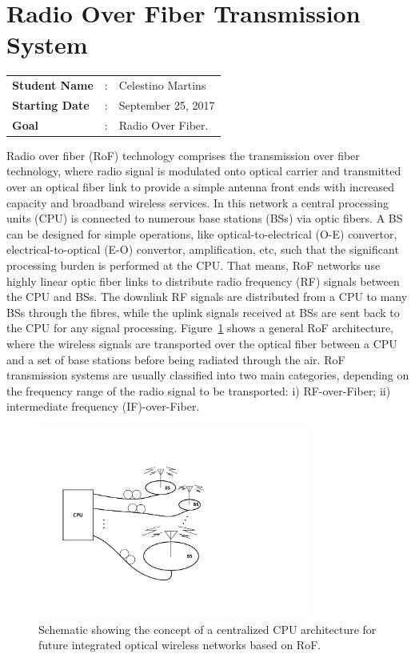 \clearpage
\section{Radio Over Fiber Transmission System}

\begin{tcolorbox}	
\begin{tabular}{p{2.75cm} p{0.2cm} p{10.5cm}} 	
\textbf{Student Name}  &:& Celestino Martins\\
\textbf{Starting Date} &:& September 25, 2017\\
\textbf{Goal}          &:& Radio Over Fiber.
\end{tabular}
\end{tcolorbox}

Radio over fiber (RoF) technology comprises the transmission over fiber technology, where radio signal is modulated onto optical carrier and transmitted over an optical fiber link to provide a simple antenna front ends with increased capacity and broadband wireless services.  In this network a central processing units (CPU) is connected to numerous base stations (BSs) via optic fibers. A BS can be designed for simple operations, like optical-to-electrical (O-E) convertor, electrical-to-optical (E-O) convertor,  amplification, etc, such that the significant processing burden is performed at the CPU. That means, RoF networks use highly linear optic fiber links to distribute radio frequency (RF) signals between the CPU and BSs. The downlink RF signals are distributed from a CPU to many BSs through the fibres, while the uplink signals received at BSs are sent back to the CPU for any signal processing. Figure~\ref{fig_RoFarch} shows a general RoF architecture, where the wireless signals are transported over the optical fiber between a CPU and a set of base stations before being radiated through the air. RoF transmission systems are usually classified into two main categories, depending on the frequency range of the radio signal to be transported: i) RF-over-Fiber; ii) intermediate frequency (IF)-over-Fiber.

\begin{figure}[h!]
    \centering
    \includegraphics[width=9cm]{./sdf/radio_over_fiber/figures/RoF_architecture.pdf}
    \caption{Schematic showing the concept of a centralized CPU architecture for future integrated optical wireless networks based on RoF.}
    \label{fig_RoFarch}
\end{figure}

